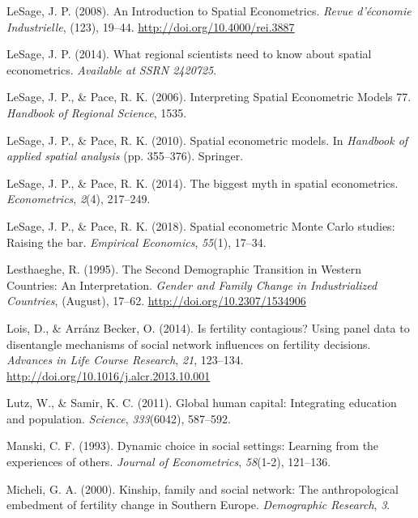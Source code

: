 \documentclass[12pt,twoside]{reedthesis}
\begin{document}
\leavevmode\hypertarget{ref-lesage2008}{}%
LeSage, J. P. (2008). An Introduction to Spatial Econometrics. \emph{Revue d'économie Industrielle}, (123), 19--44. \url{http://doi.org/10.4000/rei.3887}

\leavevmode\hypertarget{ref-lesage2014a}{}%
LeSage, J. P. (2014). What regional scientists need to know about spatial econometrics. \emph{Available at SSRN 2420725}.

\leavevmode\hypertarget{ref-lesage2006}{}%
LeSage, J. P., \& Pace, R. K. (2006). Interpreting Spatial Econometric Models 77. \emph{Handbook of Regional Science}, 1535.

\leavevmode\hypertarget{ref-lesage2010}{}%
LeSage, J. P., \& Pace, R. K. (2010). Spatial econometric models. In \emph{Handbook of applied spatial analysis} (pp. 355--376). Springer.

\leavevmode\hypertarget{ref-lesage2014}{}%
LeSage, J. P., \& Pace, R. K. (2014). The biggest myth in spatial econometrics. \emph{Econometrics}, \emph{2}(4), 217--249.

\leavevmode\hypertarget{ref-lesage2018}{}%
LeSage, J. P., \& Pace, R. K. (2018). Spatial econometric Monte Carlo studies: Raising the bar. \emph{Empirical Economics}, \emph{55}(1), 17--34.

\leavevmode\hypertarget{ref-lesthaeghe1995}{}%
Lesthaeghe, R. (1995). The Second Demographic Transition in Western Countries: An Interpretation. \emph{Gender and Family Change in Industrialized Countries}, (August), 17--62. \url{http://doi.org/10.2307/1534906}

\leavevmode\hypertarget{ref-lois2014}{}%
Lois, D., \& Arránz Becker, O. (2014). Is fertility contagious? Using panel data to disentangle mechanisms of social network influences on fertility decisions. \emph{Advances in Life Course Research}, \emph{21}, 123--134. \url{http://doi.org/10.1016/j.alcr.2013.10.001}

\leavevmode\hypertarget{ref-lutz2011}{}%
Lutz, W., \& Samir, K. C. (2011). Global human capital: Integrating education and population. \emph{Science}, \emph{333}(6042), 587--592.

\leavevmode\hypertarget{ref-manski1993}{}%
Manski, C. F. (1993). Dynamic choice in social settings: Learning from the experiences of others. \emph{Journal of Econometrics}, \emph{58}(1-2), 121--136.

\leavevmode\hypertarget{ref-micheli2000}{}%
Micheli, G. A. (2000). Kinship, family and social network: The anthropological embedment of fertility change in Southern Europe. \emph{Demographic Research}, \emph{3}.
\end{document}
